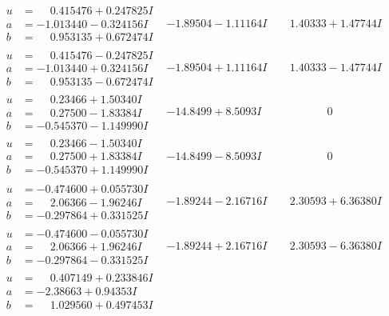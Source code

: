 \documentclass[1p]{elsarticle_modified}
\theoremstyle{definition}
\begin{document}
$$\begin{array}{c|c|c}
\begin{aligned}
u &= \phantom{-}0.415476 + 0.247825 I \\
a &= -1.013440 - 0.324156 I \\
b &= \phantom{-}0.953135 + 0.672474 I\end{aligned}
 & -1.89504 - 1.11164 I & \phantom{-}1.40333 + 1.47744 I \\ \hline\begin{aligned}
u &= \phantom{-}0.415476 - 0.247825 I \\
a &= -1.013440 + 0.324156 I \\
b &= \phantom{-}0.953135 - 0.672474 I\end{aligned}
 & -1.89504 + 1.11164 I & \phantom{-}1.40333 - 1.47744 I \\ \hline\begin{aligned}
u &= \phantom{-}0.23466 + 1.50340 I \\
a &= \phantom{-}0.27500 - 1.83384 I \\
b &= -0.545370 - 1.149990 I\end{aligned}
 & -14.8499 + 8.5093 I & \phantom{-0.000000 } 0 \\ \hline\begin{aligned}
u &= \phantom{-}0.23466 - 1.50340 I \\
a &= \phantom{-}0.27500 + 1.83384 I \\
b &= -0.545370 + 1.149990 I\end{aligned}
 & -14.8499 - 8.5093 I & \phantom{-0.000000 } 0 \\ \hline\begin{aligned}
u &= -0.474600 + 0.055730 I \\
a &= \phantom{-}2.06366 - 1.96246 I \\
b &= -0.297864 + 0.331525 I\end{aligned}
 & -1.89244 - 2.16716 I & \phantom{-}2.30593 + 6.36380 I \\ \hline\begin{aligned}
u &= -0.474600 - 0.055730 I \\
a &= \phantom{-}2.06366 + 1.96246 I \\
b &= -0.297864 - 0.331525 I\end{aligned}
 & -1.89244 + 2.16716 I & \phantom{-}2.30593 - 6.36380 I \\ \hline\begin{aligned}
u &= \phantom{-}0.407149 + 0.233846 I \\
a &= -2.38663 + 0.94353 I \\
b &= \phantom{-}1.029560 + 0.497453 I\end{aligned}

\end{array}$$
\end{document}
